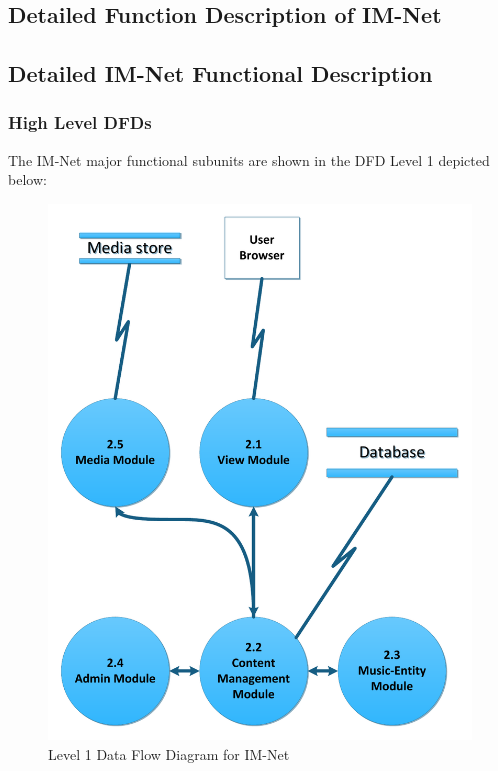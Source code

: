 \documentclass[letterpaper,12pt]{article}
\newcommand{\Section}[1]{\section{#1} \setcounter{figure}{0}}
\begin{document}
{\eject

\textcolor{section}{\Section{Detailed Function Description of IM-Net}}

\textcolor{subsection}{\subsection{Detailed IM-Net Functional Description}}

\textcolor{subsubsection}{\subsubsection{High Level DFDs}}

The IM-Net major functional subunits are shown in the DFD Level 1 depicted below:

\begin{figure}[h!]
\centering
\includegraphics[scale=0.6]{DFD_level_1.pdf}
\caption{Level 1 Data Flow Diagram for IM-Net}
\label{fig:Level 1 Data Flow Diagram for IM-Net}
\end{figure}
 
}
\end{document}
